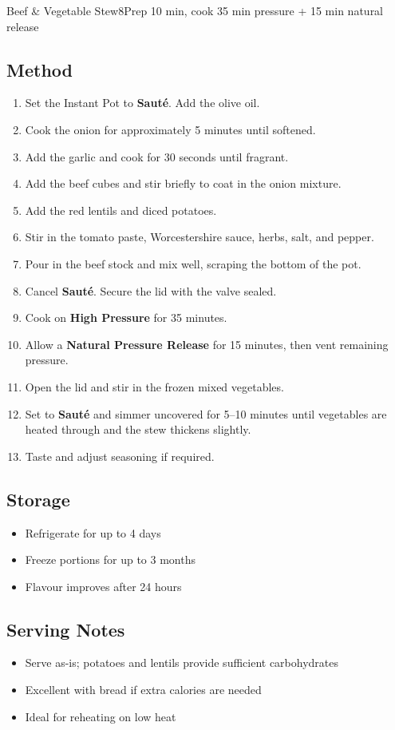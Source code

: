 \begin{recipebox}{Beef \& Vegetable Stew}{8}{Prep 10 min, cook 35 min pressure + 15 min natural release}
\subsection*{Method}
\begin{enumerate}
    \item Set the Instant Pot to \textbf{Sauté}. Add the olive oil.
    \item Cook the onion for approximately 5 minutes until softened.
    \item Add the garlic and cook for 30 seconds until fragrant.
    \item Add the beef cubes and stir briefly to coat in the onion mixture.
    \item Add the red lentils and diced potatoes.
    \item Stir in the tomato paste, Worcestershire sauce, herbs, salt, and pepper.
    \item Pour in the beef stock and mix well, scraping the bottom of the pot.
    \item Cancel \textbf{Sauté}. Secure the lid with the valve sealed.
    \item Cook on \textbf{High Pressure} for 35 minutes.
    \item Allow a \textbf{Natural Pressure Release} for 15 minutes, then vent remaining pressure.
    \item Open the lid and stir in the frozen mixed vegetables.
    \item Set to \textbf{Sauté} and simmer uncovered for 5--10 minutes until vegetables are heated through and the stew thickens slightly.
    \item Taste and adjust seasoning if required.
\end{enumerate}

\subsection*{Storage}
\begin{itemize}
    \item Refrigerate for up to 4 days
    \item Freeze portions for up to 3 months
    \item Flavour improves after 24 hours
\end{itemize}

\subsection*{Serving Notes}
\begin{itemize}
    \item Serve as-is; potatoes and lentils provide sufficient carbohydrates
    \item Excellent with bread if extra calories are needed
    \item Ideal for reheating on low heat
\end{itemize}


\end{recipebox}
